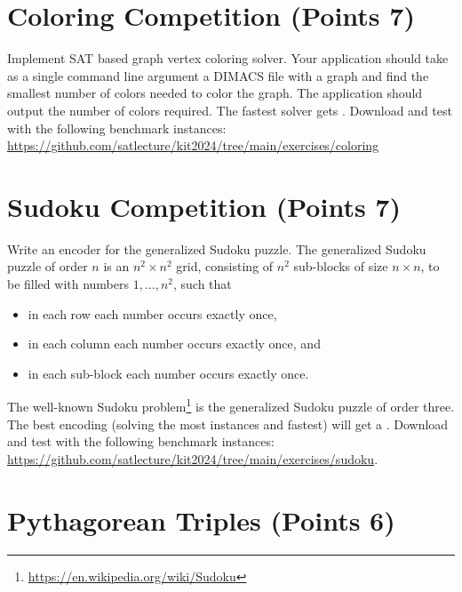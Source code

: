 \documentclass{article}
\begin{document}

\section{Coloring Competition (Points 7)}

Implement SAT based graph vertex coloring solver.
Your application should take as a single command line argument a DIMACS file with a graph and find the smallest number of colors needed to color the graph.
The application should output the number of colors required.
The fastest solver gets .
Download and test with the following benchmark instances: \url{https://github.com/satlecture/kit2024/tree/main/exercises/coloring}

\section{Sudoku Competition (Points 7)}

Write an encoder for the generalized Sudoku puzzle.
The generalized Sudoku puzzle of order $n$ is an $n^2 \times n^2$ grid, consisting of $n^2$ sub-blocks of size $n \times n$, to be filled with numbers $1, \dots, n^2$, such that
\begin{itemize}\setlength{\itemsep}{0pt}
\item in each row each number occurs exactly once,
\item in each column each number occurs exactly once, and
\item in each sub-block each number occurs exactly once.
\end{itemize}
The well-known Sudoku problem\footnote{\url{https://en.wikipedia.org/wiki/Sudoku}} is the generalized Sudoku puzzle of order three.
The best encoding (solving the most instances and fastest) will get a .
Download and test with the following benchmark instances: \url{https://github.com/satlecture/kit2024/tree/main/exercises/sudoku}.


\section{Pythagorean Triples (Points 6)}
\end{document}
